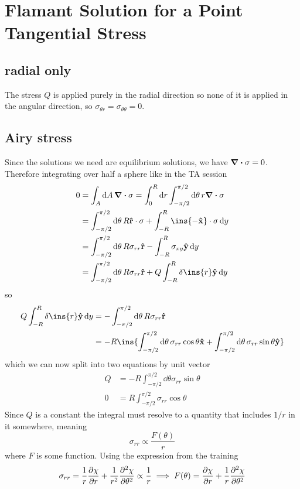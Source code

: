 \clearpage
\section{Flamant Solution for a Point Tangential Stress}
\subsection{radial only}
The stress \(Q\) is applied purely in the radial direction so none of it is applied in the angular direction, so \(\sigma_{\theta r}=\sigma_{\theta\theta}=0\).
\subsection{Airy stress}
Since the solutions we need are equilibrium solutions, we have \(\div{\vb{\sigma}}=0\). Therefore integrating over half a sphere like in the TA session
\begin{align}
	0&=\int_A\dd{A}\div{\vb{\sigma}}=\int_{0}^{R}\dd{r}\int_{-\pi/2}^{\pi/2}\dd{\theta}r\div{\vb{\sigma}}\\
	&=\int_{-\pi/2}^{\pi/2}\dd{\theta}R\vu{r}\cdot\vb{\sigma}+\int_{-R}^{R}\ins{-\vu{x}}\cdot\vb{\sigma}\dd{y}\\
	&= \int_{-\pi/2}^{\pi/2}\dd{\theta}R\sigma_{rr}\vu{r}-\int_{-R}^{R}\sigma_{xy}\vu{y}\dd{y}\\
	&= \int_{-\pi/2}^{\pi/2}\dd{\theta}R\sigma_{rr}\vu{r}+Q\int_{-R}^{R}\delta\ins{r}\vu{y}\dd{y}
\end{align}
so 
\begin{align}
	Q\int_{-R}^{R}\delta\ins{r}\vu{y}\dd{y} &= -\int_{-\pi/2}^{\pi/2}\dd{\theta}R\sigma_{rr}\vu{r}\\
	&= -R\ins{\int_{-\pi/2}^{\pi/2}\dd{\theta}\sigma_{rr}\cos\theta\vu{x}+\int_{-\pi/2}^{\pi/2}\dd{\theta}\sigma_{rr}\sin\theta\vu{y}}
\end{align}
which we can now split into two equations by unit vector
\begin{align}
	Q &= -R\int_{-\pi/2}^{\pi/2}\dd{\theta}\sigma_{rr}\sin\theta\\
	0 &= R\int_{-\pi/2}^{\pi/2}\sigma_{rr}\cos\theta
\end{align}
Since \(Q\) is a constant the integral must resolve to a quantity that includes \(1/r\) in it somewhere, meaning
\begin{equation}
	\sigma_{rr}\propto \frac{F(\theta)}{r}
\end{equation}
where \(F\) is some function. Using the expression from the training
\begin{equation}
	\sigma_{rr}=\frac{1}{r}\pdv{\chi}{r}+\frac{1}{r^2}\pdv[2]{\chi}{\theta}\propto\frac{1}{r}\implies F(\theta)=\pdv{\chi}{r}+\frac{1}{r}\pdv[2]{\chi}{\theta}
\end{equation}
